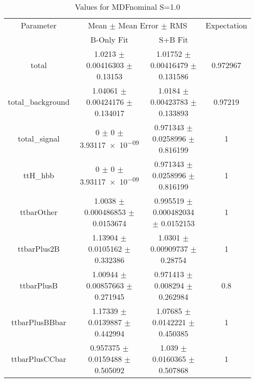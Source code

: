 \begin{table}
\centering
\caption{Values for MDFnominal S=1.0}
\begin{tabular}{cccc}
\toprule
Parameter & \multicolumn{2}{c}{Mean $\pm$ Mean Error $\pm$ RMS} & Expectation\\
 & B-Only Fit & S+B Fit & \\
\midrule
total & \num{1.0213} $\pm$ \num{0.00416303} $\pm$ \num{0.13153} & \num{1.01752} $\pm$ \num{0.00416479} $\pm$ \num{0.131586} & \num{0.972967}\\
total\_background & \num{1.04061} $\pm$ \num{0.00424176} $\pm$ \num{0.134017} & \num{1.0184} $\pm$ \num{0.00423783} $\pm$ \num{0.133893} & \num{0.97219}\\
total\_signal & \num{0} $\pm$ \num{0} $\pm$ \num{3.93117e-09} & \num{0.971343} $\pm$ \num{0.0258996} $\pm$ \num{0.816199} & \num{1}\\
ttH\_hbb & \num{0} $\pm$ \num{0} $\pm$ \num{3.93117e-09} & \num{0.971343} $\pm$ \num{0.0258996} $\pm$ \num{0.816199} & \num{1}\\
ttbarOther & \num{1.0038} $\pm$ \num{0.000486853} $\pm$ \num{0.0153674} & \num{0.995519} $\pm$ \num{0.000482034} $\pm$ \num{0.0152153} & \num{1}\\
ttbarPlus2B & \num{1.13904} $\pm$ \num{0.0105162} $\pm$ \num{0.332386} & \num{1.0301} $\pm$ \num{0.00909737} $\pm$ \num{0.28754} & \num{1}\\
ttbarPlusB & \num{1.00944} $\pm$ \num{0.00857663} $\pm$ \num{0.271945} & \num{0.971413} $\pm$ \num{0.008294} $\pm$ \num{0.262984} & \num{0.8}\\
ttbarPlusBBbar & \num{1.17339} $\pm$ \num{0.0139887} $\pm$ \num{0.442994} & \num{1.07685} $\pm$ \num{0.0142221} $\pm$ \num{0.450385} & \num{1}\\
ttbarPlusCCbar & \num{0.957375} $\pm$ \num{0.0159488} $\pm$ \num{0.505092} & \num{1.039} $\pm$ \num{0.0160365} $\pm$ \num{0.507868} & \num{1}\\
\bottomrule
\end{tabular}
\end{table}